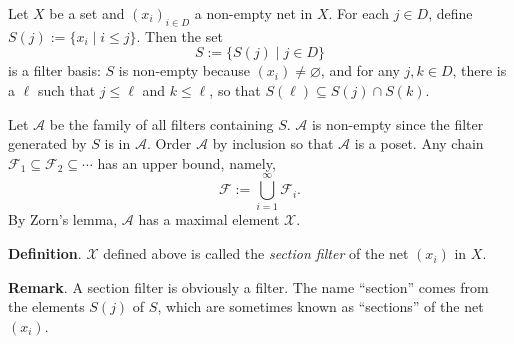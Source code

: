 \documentclass[12pt]{article}
\begin{document}
Let $X$ be a set and $(x_i)_{i\in D}$ a non-empty net in $X$.  For each $j\in D$, define $S(j):=\lbrace x_i\mid i\le j\rbrace$.  Then the set $$S:=\lbrace S(j)\mid j\in D\rbrace$$ is a filter basis: $S$ is non-empty because $(x_i)\neq \varnothing$, and for any $j,k\in D$, there is a $\ell$ such that $j\le \ell$ and $k\le \ell$, so that $S(\ell) \subseteq S(j)\cap S(k)$.

Let $\mathcal{A}$ be the family of all filters containing $S$.  $\mathcal{A}$ is non-empty since the filter generated by $S$ is in $\mathcal{A}$.  Order $\mathcal{A}$ by inclusion so that $\mathcal{A}$ is a poset.  Any chain $\mathcal{F}_1\subseteq \mathcal{F}_2\subseteq\cdots $ has an upper bound, namely, $$\mathcal{F}:=\bigcup_{i=1}^{\infty} \mathcal{F}_i.$$  By Zorn's lemma, $\mathcal{A}$ has a maximal element $\mathcal{X}$.  

\textbf{Definition}.  $\mathcal{X}$ defined above is called the \emph{section filter} of the net $(x_i)$ in $X$.

\textbf{Remark}.  A section filter is obviously a filter.  The name ``section'' comes from the elements $S(j)$ of $S$, which are sometimes known as ``sections'' of the net $(x_i)$.

\end{document}
